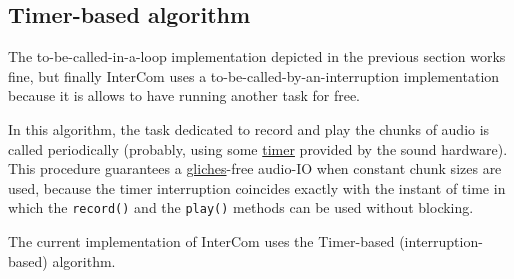\subsection{Timer-based algorithm}

The to-be-called-in-a-loop implementation depicted in the previous
section works fine, but finally InterCom uses a
to-be-called-by-an-interruption implementation because it is allows to
have running another task for free.

In this algorithm, the task dedicated to record and play the chunks of
audio is called periodically (probably, using some
\href{https://en.wikipedia.org/wiki/Timer}{timer} provided by the
sound hardware). This procedure guarantees a
\href{https://en.wikipedia.org/wiki/Glitch}{gliches}-free audio-IO
when constant chunk sizes are used, because the timer interruption
coincides exactly with the instant of time in which the
\verb|record()| and the \verb|play()| methods can be used without
blocking.
\begin{comment}
The following pseudo-code describes the new algorithm, which
is basically the previous one, except that the chunk size is fixed.

\begin{lstlisting}[language=Python,numbers=left]
  # Timer-based algorithm (to be called periodically)
  def record_IO_and_play(chunk_size):
     chunk = record(chunk_size)
     packed_chunk = pack(chunk)
     send(packed_chunk)
     packed_chunk = receive()
     chunk = unpack(packed_chunk)
     play(chunk)
\end{lstlisting}
\end{comment}


The current implementation of InterCom uses the Timer-based
(interruption-based) algorithm.

